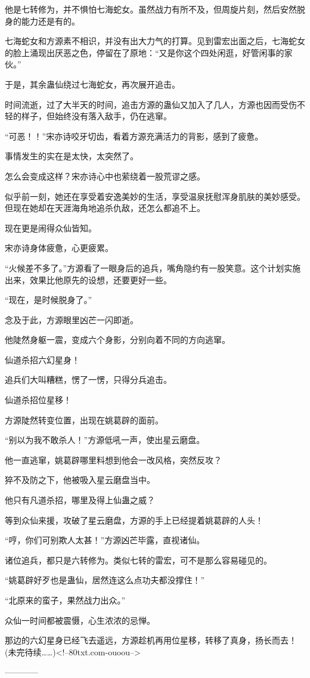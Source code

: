 \begin{this_body}
他是七转修为，并不惧怕七海蛇女。虽然战力有所不及，但周旋片刻，然后安然脱身的能力还是有的。

七海蛇女和方源素不相识，并没有出大力气的打算。见到雷宏出面之后，七海蛇女的脸上涌现出厌恶之色，停留在了原地：“又是你这个四处闲逛，好管闲事的家伙。”

于是，其余蛊仙绕过七海蛇女，再次展开追击。

时间流逝，过了大半天的时间，追击方源的蛊仙又加入了几人，方源也因而受伤不轻的样子，但始终没有落入敌手，仍在逃窜。

“可恶！！”宋亦诗咬牙切齿，看着方源充满活力的背影，感到了疲惫。

事情发生的实在是太快，太突然了。

怎么会变成这样？宋亦诗心中也萦绕着一股荒谬之感。

似乎前一刻，她还在享受着安逸美妙的生活，享受温泉抚慰浑身肌肤的美妙感受。但现在她却在天涯海角地追杀仇敌，还怎么都追不上。

现在更是闹得众仙皆知。

宋亦诗身体疲惫，心更疲累。

“火候差不多了。”方源看了一眼身后的追兵，嘴角隐约有一股笑意。这个计划实施出来，效果比他原先的设想，还要更好一些。

“现在，是时候脱身了。”

念及于此，方源眼里凶芒一闪即逝。

他陡然身躯一震，变成六个身影，分别向着不同的方向逃窜。

仙道杀招六幻星身！

追兵们大叫糟糕，愣了一愣，只得分兵追击。

仙道杀招位星移！

方源陡然转变位置，出现在姚葛辟的面前。

“别以为我不敢杀人！”方源低吼一声，使出星云磨盘。

他一直逃窜，姚葛辟哪里料想到他会一改风格，突然反攻？

猝不及防之下，他被吸入星云磨盘当中。

他只有凡道杀招，哪里及得上仙蛊之威？

等到众仙来援，攻破了星云磨盘，方源的手上已经提着姚葛辟的人头！

“哼，你们可别欺人太甚！”方源凶芒毕露，直视诸仙。

诸位追兵，都只是六转修为。类似七转的雷宏，可不是那么容易碰见的。

“姚葛辟好歹也是蛊仙，居然连这么点功夫都没撑住！”

“北原来的蛮子，果然战力出众。”

众仙一时间都被震慑，心生浓浓的忌惮。

那边的六幻星身已经飞去遥远，方源趁机再用位星移，转移了真身，扬长而去！(未完待续……)<!--80txt.com-ouoou-->

------------

\end{this_body}

